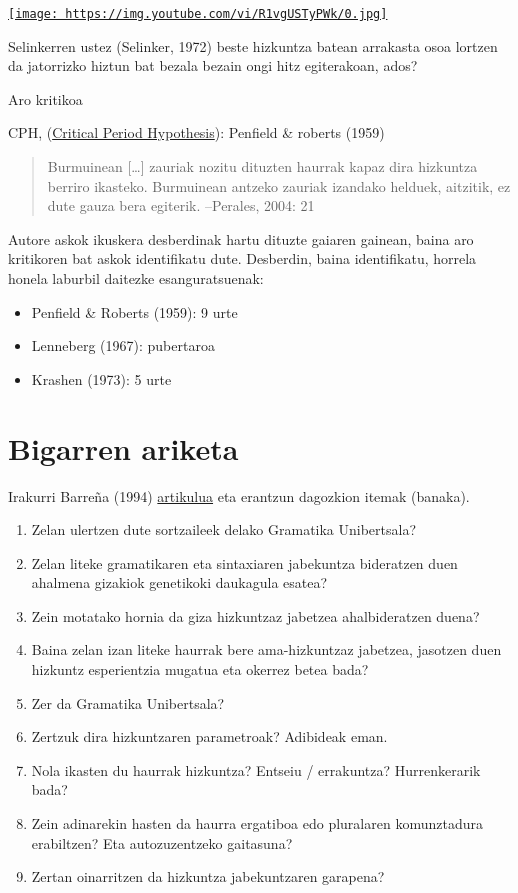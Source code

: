 \documentclass[
]{book}
\providecommand{\tightlist}{%
  \setlength{\itemsep}{0pt}\setlength{\parskip}{0pt}}
\begin{document}
\href{http://www.youtube.com/watch?v=R1vgUSTyPWk}{\texttt{[image: https://img.youtube.com/vi/R1vgUSTyPWk/0.jpg]}}

Selinkerren ustez (Selinker, 1972) beste hizkuntza batean arrakasta osoa lortzen da jatorrizko hiztun bat bezala bezain ongi hitz egiterakoan, ados?

Aro kritikoa

CPH, (\href{https://en.wikipedia.org/wiki/Critical_period_hypothesis}{Critical Period Hypothesis}): Penfield \& roberts (1959)

\begin{quote}
Burmuinean {[}\ldots{]} zauriak nozitu dituzten haurrak kapaz dira hizkuntza berriro ikasteko. Burmuinean antzeko zauriak izandako helduek, aitzitik, ez dute gauza bera egiterik.
--Perales, 2004: 21
\end{quote}

Autore askok ikuskera desberdinak hartu dituzte gaiaren gainean, baina aro kritikoren bat askok identifikatu dute. Desberdin, baina identifikatu, horrela honela laburbil daitezke esanguratsuenak:

\begin{itemize}
\tightlist
\item
  Penfield \& Roberts (1959): 9 urte
\item
  Lenneberg (1967): pubertaroa
\item
  Krashen (1973): 5 urte
\end{itemize}

\hypertarget{T1A2}{%
\section*{Bigarren ariketa}\label{T1A2}}

Irakurri Barreña (1994) \href{https://zientzia.eus/artikuluak/chomskyren-arauak-eta-hizkuntz-jabekuntza/}{artikulua} eta erantzun dagozkion itemak (banaka).

\begin{enumerate}
\def\labelenumi{\arabic{enumi}.}
\tightlist
\item
  Zelan ulertzen dute sortzaileek delako Gramatika Unibertsala?
\item
  Zelan liteke gramatikaren eta sintaxiaren jabekuntza bideratzen duen ahalmena gizakiok genetikoki daukagula esatea?
\item
  Zein motatako hornia da giza hizkuntzaz jabetzea ahalbideratzen duena?
\item
  Baina zelan izan liteke haurrak bere ama-hizkuntzaz jabetzea, jasotzen duen hizkuntz esperientzia mugatua eta okerrez betea bada?
\item
  Zer da Gramatika Unibertsala?
\item
  Zertzuk dira hizkuntzaren parametroak? Adibideak eman.
\item
  Nola ikasten du haurrak hizkuntza? Entseiu / errakuntza? Hurrenkerarik bada?
\item
  Zein adinarekin hasten da haurra ergatiboa edo pluralaren komunztadura erabiltzen? Eta autozuzentzeko gaitasuna?
\item
  Zertan oinarritzen da hizkuntza jabekuntzaren garapena?
\end{enumerate}
\end{document}
